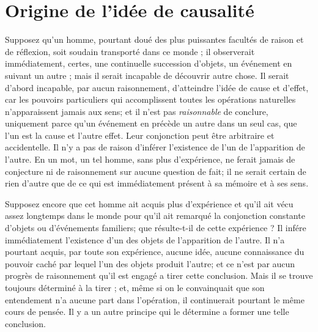 
\section{Origine de l'idée de causalité}

Supposez qu’un homme, pourtant doué des plus puissantes
facultés de raison et de réflexion, soit soudain
transporté dans ce monde ; il observerait immédiatement,
certes, une continuelle succession d’objets, un événement
en suivant un autre ; mais il serait incapable de découvrir
autre chose. Il serait d’abord incapable, par aucun raisonnement,
d’atteindre l’idée de cause et d’effet, car les
pouvoirs particuliers qui accomplissent toutes les opérations
naturelles n’apparaissent jamais aux sens; et il
n’est pas {\it raisonnable} de conclure, uniquement parce
qu’un événement en précède un autre dans un seul cas,
que l'un est la cause et l’autre effet. Leur conjonction
peut être arbitraire et accidentelle. Il n’y a pas de raison
d'inférer l’existence de l'un de l’apparition de l’autre.
En un mot, un tel homme, sans plus d’expérience, ne
ferait jamais de conjecture ni de raisonnement sur aucune
question de fait; il ne serait certain de rien d’autre que
de ce qui est immédiatement présent à sa mémoire et
à ses sens.

Supposez encore que cet homme ait acquis plus d’expérience
et qu’il ait vécu assez longtemps dans le monde
pour qu’il ait remarqué la conjonction constante d’objets
ou d’événements familiers; que résulte-t-il de cette
expérience ? Il infére immédiatement l’existence d’un
des objets de l’apparition de l’autre. Il n’a pourtant acquis,
par toute son expérience, aucune idée, aucune connaissance
du pouvoir caché par lequel l’un des objets produit
l'autre; et ce n’est par aucun progrès de raisonnement
qu’il est engagé a tirer cette conclusion. Mais il se trouve
toujours déterminé à la tirer ; et, même si on le convainquait
que son entendement n’a aucune part dans l’opération,
il continuerait pourtant le même cours de pensée. Il y a un
autre principe qui le détermine a former une telle conclusion.

